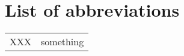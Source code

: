 \chapter*{List of abbreviations}

\begin{table}[htbp]
  \begin{center}
    \begin{tabular}{ll}

      XXX &	something \\

    \end{tabular}
  \end{center}
\end{table}
